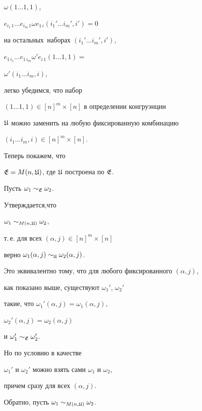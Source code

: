 \begin{pf}
$\omega(1\dotsc 1,1)$,\





$e_{i_1\, 1}\dotsc e_{i_m\, 1}\omega e_{1\, i}(i_1'\dotsc i_m',i')=0$


на остальных\ наборах $(i_1'\dotsc i_m',i')$,





$e_{1\, i_1}\dotsc e_{1\, i_m}\omega' e_{i\, 1}(1\dotsc 1,1)=$


$\omega'(i_1\dotsc i_m,i)$,





\noindent{}легко убедимся, что набор


$(1\dotsc 1,1)\in [n]^m\times [n]$ в определении конгруэнции


$\frak U$ можно заменить на любую фиксированную комбинацию


$(i_1\dotsc i_m,i)\in [n]^m\times [n]$.





Теперь покажем, что


$\frak E=M(n,\frak U)$, где $\frak U$ построена по $\frak E$.


Пусть $\omega_1\sim_{\frak E}\omega_2$.


Утверждается,что


$\omega_1\sim_{M(n,\frak U)}\omega_2$,


т.\,е. для всех $(\alpha,j)\in [n]^m\times [n]$


верно $\omega_1(\alpha,j)\sim_{\frak U}\omega_2(\alpha,j)$.


Это эквивалентно тому, что для любого фиксированного $(\alpha,j)$,


как показано выше, существуют $\omega_1'$, $\omega_2'$


такие, что $\omega_1'(\alpha,j)=\omega_1(\alpha,j)$,


$\omega_2'(\alpha,j)=\omega_2(\alpha,j)$


и $\omega_1'\sim_{\frak E}\omega_2'$.


Но по условию в качестве


$\omega_1'$ и $\omega_2'$ можно взять сами $\omega_1$ и $\omega_2$,


причем сразу для всех $(\alpha,j)$.








Обратно, пусть $\omega_1\sim_{M(n,\frak U)}\omega_2$.



\end{pf}
